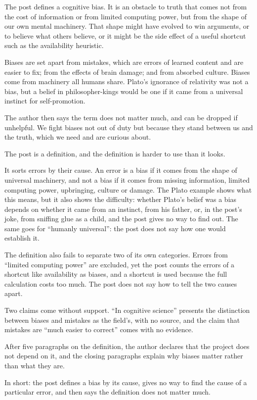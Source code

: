 \begin{afterword}
\summaryhead

The post defines a cognitive bias. It is an obstacle to truth that comes not from the cost of information or from limited computing power, but from the shape of our own mental machinery. That shape might have evolved to win arguments, or to believe what others believe, or it might be the side effect of a useful shortcut such as the availability heuristic.

Biases are set apart from mistakes, which are errors of learned content and are easier to fix; from the effects of brain damage; and from absorbed culture. Biases come from machinery all humans share. Plato's ignorance of relativity was not a bias, but a belief in philosopher-kings would be one if it came from a universal instinct for self-promotion.

The author then says the term does not matter much, and can be dropped if unhelpful. We fight biases not out of duty but because they stand between us and the truth, which we need and are curious about.

\responsehead

The post is a definition, and the definition is harder to use than it looks.

It sorts errors by their cause. An error is a bias if it comes from the shape of universal machinery, and not a bias if it comes from missing information, limited computing power, upbringing, culture or damage. The Plato example shows what this means, but it also shows the difficulty: whether Plato's belief was a bias depends on whether it came from an instinct, from his father, or, in the post's joke, from sniffing glue as a child, and the post gives no way to find out. The same goes for ``humanly universal'': the post does not say how one would establish it.

The definition also fails to separate two of its own categories. Errors from ``limited computing power'' are excluded, yet the post counts the errors of a shortcut like availability as biases, and a shortcut is used because the full calculation costs too much. The post does not say how to tell the two causes apart.

Two claims come without support. ``In cognitive science'' presents the distinction between biases and mistakes as the field's, with no source, and the claim that mistakes are ``much easier to correct'' comes with no evidence.

After five paragraphs on the definition, the author declares that the project does not depend on it, and the closing paragraphs explain why biases matter rather than what they are.

In short: the post defines a bias by its cause, gives no way to find the cause of a particular error, and then says the definition does not matter much.
\end{afterword}
